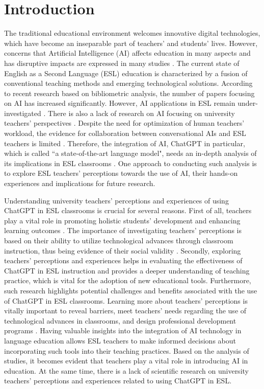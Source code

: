 \documentclass[english]{textolivre}
\begin{document}
\section{Introduction}
The traditional educational environment welcomes innovative digital technologies, which have become an inseparable part of teachers’ and students’ lives. However, concerns that Artificial Intelligence (AI) affects education in many aspects and has disruptive impacts are expressed in many studies \cites[p. 21]{bereczki2021}{hie2023}[p. 249]{sumakul2022}. The current state of English as a Second Language (ESL) education is characterized by a fusion of conventional teaching methods and emerging technological solutions. According to recent research based on bibliometric analysis, the number of papers focusing on AI has increased significantly. However, AI applications in ESL remain under-investigated \cite[p. 112]{huang2023}. There is also a lack of research on AI focusing on university teachers’ perspectives \cites[p. 1]{schroder2023}[p. 132]{synekop2024}[p. 16]{zawacki-richter2019}. Despite the need for optimization of human teachers’ workload, the evidence for collaboration between conversational AIs and ESL teachers is limited \cite[p. 48]{ji2022}. Therefore, the integration of AI, ChatGPT in particular, which is called ``a state-of-the-art language model", needs an in-depth analysis of its implications in ESL classrooms \cites[p. 542]{holmes2022}[p. 97]{iqbal2023}. One approach to conducting such analysis is to explore ESL teachers’ perceptions towards the use of AI, their hands-on experiences and implications for future research.

Understanding university teachers’ perceptions and experiences of using ChatGPT in ESL classrooms is crucial for several reasons. First of all, teachers play a vital role in promoting holistic students’ development and enhancing learning outcomes \cite[p. 7591]{mavropoulou2023}. The importance of investigating teachers’ perceptions is based on their ability to utilize technological advances through classroom instruction, thus being evidence of their social validity \cite{wilson2021}. Secondly, exploring teachers’ perceptions and experiences helps in evaluating the effectiveness of ChatGPT in ESL instruction and provides a deeper understanding of teaching practice, which is vital for the adoption of new educational tools. Furthermore, such research highlights potential challenges and benefits associated with the use of ChatGPT in ESL classrooms. Learning more about teachers’ perceptions is vitally important to reveal barriers, meet teachers’ needs regarding the use of technological advances in classrooms, and design professional development programs \cites[p. 67]{cope2002}[p. 309]{ottenbreit-leftwich2018}. Having valuable insights into the integration of AI technology in language education allows ESL teachers to make informed decisions about incorporating such tools into their teaching practices. Based on the analysis of studies, it becomes evident that teachers play a vital role in introducing AI in education. At the same time, there is a lack of scientific research on university teachers’ perceptions and experiences related to using ChatGPT in ESL.
\end{document}
